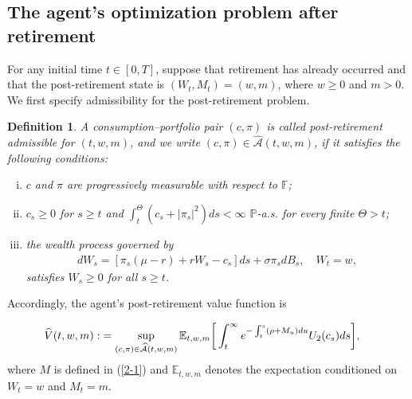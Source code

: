 \documentclass[a4paper,11pt]{amsart}
\numberwithin{equation}{section}
\newtheorem{theorem}{Theorem}[section]
\newtheorem{definition}{Definition}[section]
\newcommand{\blue}[1]{{\color{black}#1}}
\begin{document}
	

	\subsection{The agent's optimization problem after retirement}
	{\color{black}
For any initial time $t\in[0,T]$, suppose that retirement has already occurred and that the post-retirement state is $(W_t,M_t)=(w,m)$, where $w\geq0$ and $m>0$. We first specify admissibility for the post-retirement problem.
\begin{definition}\label{postadmissible}
A consumption--portfolio pair $(c,\pi)$ is called post-retirement admissible for $(t,w,m)$, and we write $(c,\pi)\in\widehat{\mathcal A}(t,w,m)$, if it satisfies the following conditions:
\begin{enumerate}[(i)]
\item $c$ and $\pi$ are progressively measurable with respect to $\mathbb F$;
\item $c_s\geq0$ for $s\geq t$ and $\int_t^\Theta (c_s+|\pi_s|^2)ds<\infty$ $\mathbb P$-a.s. for every finite $\Theta >t$;
\item the wealth process governed by
\begin{align*}
dW_s=[\pi_s(\mu-r)+rW_s-c_s]ds+\sigma\pi_sdB_s,\quad W_t=w,
\end{align*}
satisfies $W_s\geq0$ for all $s\geq t$.
\end{enumerate}
\end{definition}
Accordingly, the agent's post-retirement value function is
}
\begin{align}\label{3-4-1}
\widehat{V}(t,w,m):&=\sup_{(c, \pi) \in \blue{\widehat{\mathcal{A}}(t,w,m)}  } \mathbb{E}_{t,w,m}\bigg[  \int_t^{\infty } e^{- \int^s_t  (\rho +M_u)du}U_2(c_s)  ds \bigg],
\end{align}
where $M$ \blue{is} defined in (\ref{2-1}) and $\mathbb{E}_{t,w,m}$ denotes the expectation conditioned on $W_t=w$ and $M_t=m$.



	
\end{document}
